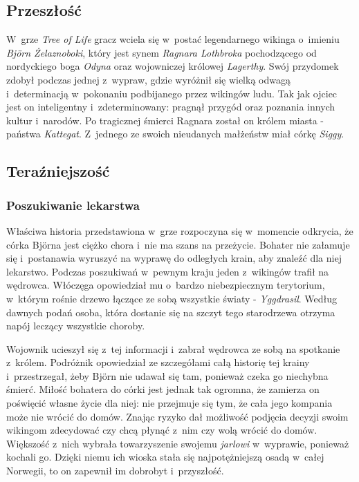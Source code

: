 \documentclass[12pt,a4paper,oneside]{book}
\theoremstyle{definition}
\numberwithin{equation}{chapter}
\begin{document}
\subsection{Przeszłość}
\par W~grze \textit{Tree of Life} gracz wciela się w~postać legendarnego wikinga o~imieniu \textit{Björn Żelaznoboki}, który jest synem \textit{Ragnara Lothbroka} pochodzącego od nordyckiego boga \textit{Odyna} oraz wojowniczej królowej \textit{Lagerthy}. Swój przydomek zdobył podczas jednej z~wypraw, gdzie wyróżnił się wielką odwagą i~determinacją w~pokonaniu podbijanego przez wikingów ludu. Tak jak ojciec jest on inteligentny i~zdeterminowany: pragnął przygód oraz poznania innych kultur i~narodów. Po tragicznej śmierci Ragnara został on królem miasta - państwa \textit{Kattegat}. Z~jednego ze swoich nieudanych małżeństw miał córkę \textit{Siggy}.


\subsection{Teraźniejszość}
\subsubsection{Poszukiwanie lekarstwa}
\par Właściwa historia przedstawiona w~grze rozpoczyna się w~momencie odkrycia, że córka Björna jest ciężko chora i~nie ma szans na przeżycie. Bohater nie załamuje się i~postanawia wyruszyć na wyprawę do odległych krain, aby znaleźć dla niej lekarstwo. Podczas poszukiwań w~pewnym kraju jeden z~wikingów trafił na wędrowca. Włóczęga opowiedział mu o~bardzo niebezpiecznym terytorium, w~którym rośnie drzewo łączące ze sobą wszystkie światy - \textit{Yggdrasil}. Według dawnych podań osoba, która dostanie się na szczyt tego starodrzewa otrzyma napój leczący wszystkie choroby. 

\par Wojownik ucieszył się z~tej informacji i~zabrał wędrowca ze sobą na spotkanie z~królem. Podróżnik opowiedział ze szczegółami całą historię tej krainy i~przestrzegał, żeby Björn nie udawał się tam, ponieważ czeka go niechybna śmierć. Miłość bohatera do córki jest jednak tak ogromna, że zamierza on poświęcić własne życie dla niej: nie przejmuje się tym, że cała jego kompania może nie wrócić do domów. Znając ryzyko dał możliwość podjęcia decyzji swoim wikingom zdecydować czy chcą płynąć z~nim czy wolą wrócić do domów. Większość z~nich wybrała towarzyszenie swojemu \textit{jarlowi} w~wyprawie, ponieważ kochali go. Dzięki niemu ich wioska stała się najpotężniejszą osadą w~całej Norwegii, to on zapewnił im dobrobyt i~przyszłość. 
\end{document}
